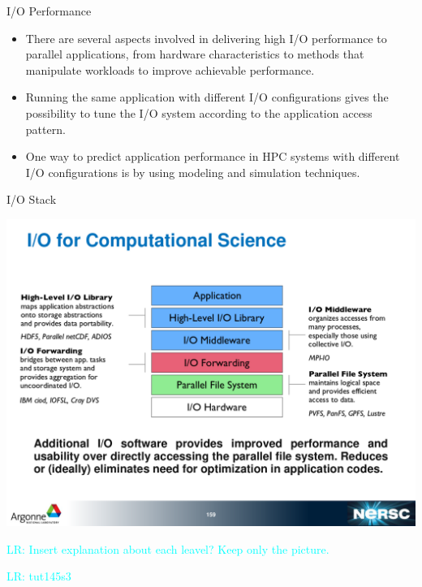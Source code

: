 \documentclass[compress,11pt,xcolor=svgnames,aspectratio=169]{beamer}
\newcommand{\lr}[1]{\textcolor{cyan}{LR: #1}}
\begin{document}
\begin{frame}[fragile] {I/O Performance}

\begin{itemize}
\setlength\itemsep{0.8cm}

  \item There are several aspects involved in delivering high I/O performance to parallel applications, from hardware characteristics to methods that manipulate workloads to improve achievable performance.

  \item Running the same application with different I/O configurations gives the possibility to tune the I/O system according to the application access pattern.

  \item One way to predict application performance in HPC systems with different I/O configurations is by using modeling and simulation techniques.

\end{itemize}

\nocite{SOPPOAASLK13}

\end{frame}

\begin{frame}[fragile] {I/O Stack}

\begin{center}
\includegraphics[scale=0.4]{fig/io-stack2}
\end{center}

\lr{Insert explanation about each leavel? Keep only the picture.}

\lr{tut145s3}

\end{frame}
\end{document}

